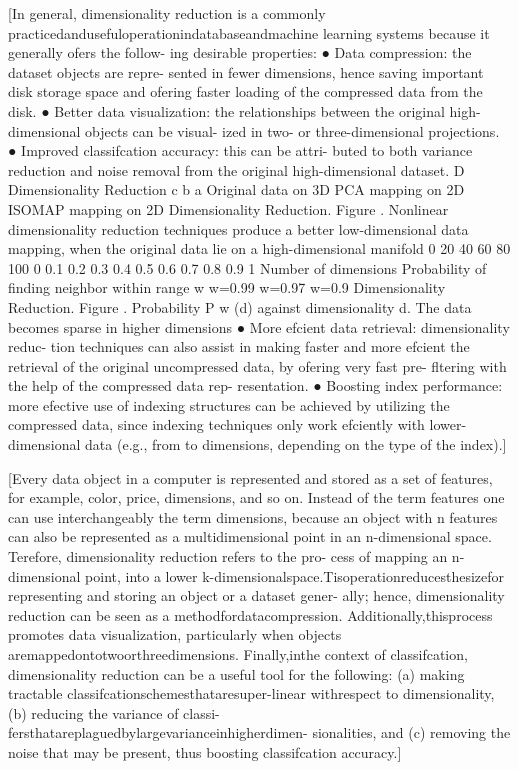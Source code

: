 [In general, dimensionality reduction is a commonly
practicedandusefuloperationindatabaseandmachine
learning systems because it generally ofers the follow-
ing desirable properties:
● Data compression: the dataset objects are repre-
sented in fewer dimensions, hence saving important
disk storage space and ofering faster loading of the
compressed data from the disk.
● Better data visualization: the relationships between
the original high-dimensional objects can be visual-
ized in two- or three-dimensional projections.
● Improved classifcation accuracy: this can be attri-
buted to both variance reduction and noise removal
from the original high-dimensional dataset.
 D Dimensionality Reduction
c b a
Original data on 3D PCA mapping on 2D ISOMAP mapping on 2D
Dimensionality Reduction. Figure . Nonlinear dimensionality reduction techniques produce a better
low-dimensional data mapping, when the original data lie on a high-dimensional manifold
0 20 40 60 80 100
0
0.1
0.2
0.3
0.4
0.5
0.6
0.7
0.8
0.9
1
Number of dimensions
Probability of finding neighbor within range w
w=0.99
w=0.97
w=0.9
Dimensionality Reduction. Figure . Probability P w (d)
against dimensionality d. The data becomes sparse in
higher dimensions
● More efcient data retrieval: dimensionality reduc-
tion techniques can also assist in making faster
and more efcient the retrieval of the original
uncompressed data, by ofering very fast pre-
fltering with the help of the compressed data rep-
resentation.
● Boosting index performance: more efective use of
indexing structures can be achieved by utilizing the
compressed data, since indexing techniques only
work efciently with lower-dimensional data (e.g.,
from  to  dimensions, depending on the type of
the index).]


[Every data object in a computer is represented and
stored as a set of features, for example, color, price,
dimensions, and so on. Instead of the term features one
can use interchangeably the term dimensions, because
an object with n features can also be represented as
a multidimensional point in an n-dimensional space.
Terefore, dimensionality reduction refers to the pro-
cess of mapping an n-dimensional point, into a lower
k-dimensionalspace.Tisoperationreducesthesizefor
representing and storing an object or a dataset gener-
ally; hence, dimensionality reduction can be seen as a
methodfordatacompression.
Additionally,thisprocess
promotes data visualization, particularly when objects
aremappedontotwoorthreedimensions.
Finally,inthe
context of classifcation, dimensionality reduction can
be a useful tool for the following: (a) making tractable
classifcationschemesthataresuper-linear withrespect
to dimensionality, (b) reducing the variance of classi-
fersthatareplaguedbylargevarianceinhigherdimen-
sionalities, and (c) removing the noise that may be
present, thus boosting classifcation accuracy.]

